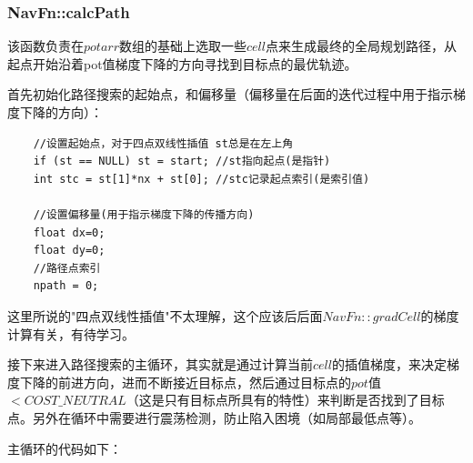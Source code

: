 \documentclass[9pt, oneside]{book}
\begin{document}
\subsubsection{NavFn::calcPath}

该函数负责在$potarr$数组的基础上选取一些$cell$点来生成最终的全局规划路径，从起点开始沿着pot值梯度下降的方向寻找到目标点的最优轨迹。

首先初始化路径搜索的起始点，和偏移量（偏移量在后面的迭代过程中用于指示梯度下降的方向）：

\begin{verbatim}
    //设置起始点，对于四点双线性插值 st总是在左上角
    if (st == NULL) st = start; //st指向起点(是指针)
    int stc = st[1]*nx + st[0]; //stc记录起点索引(是索引值)

    //设置偏移量(用于指示梯度下降的传播方向)
    float dx=0;
    float dy=0;
    //路径点索引
    npath = 0;
\end{verbatim}

这里所说的"四点双线性插值"不太理解，这个应该后后面$NavFn::gradCell$的梯度计算有关，有待学习。

接下来进入路径搜索的主循环，其实就是通过计算当前$cell$的插值梯度，来决定梯度下降的前进方向，进而不断接近目标点，然后通过目标点的$pot$值$< COST\_NEUTRAL$（这是只有目标点所具有的特性）来判断是否找到了目标点。另外在循环中需要进行震荡检测，防止陷入困境（如局部最低点等）。

主循环的代码如下：
\end{document}
